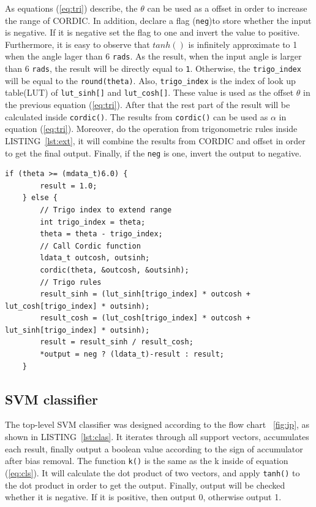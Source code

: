 \documentclass[journal]{IEEEtran}
\newcommand{\fref}[1]{\figurename~\ref{#1}}
\newcommand{\eref}[1]{(\ref{#1})}
\newcommand{\lref}[1]{LISTING~\ref{#1}}
\begin{document}
As equations \eref{eq:tri} describe, the $\theta$ can be used as a offset in order to increase the range of CORDIC.  In addition, declare a flag (\texttt{neg})to store whether the input is negative. If it is negative set the flag to one and invert the value to positive. Furthermore, it is easy to observe that $tanh()$ is infinitely approximate to 1 when the angle lager than 6 \texttt{rads}. As the result, when the input angle is larger than 6 \texttt{rads}, the result will be directly equal to \texttt{1}. Otherwise, the \texttt{trigo\_index} will be equal to the \texttt{round(theta)}. Also, \texttt{trigo\_index} is the index of look up table(LUT) of \texttt{lut\_sinh[]} and \texttt{lut\_cosh[]}. These value is used as the offset $\theta$ in the previous equation \eref{eq:tri}. After that the rest part of the result will be calculated inside \texttt{cordic()}. The results from \texttt{cordic()} can be used as $\alpha$ in equation \eref{eq:tri}. Moreover, do the operation from trigonometric rules inside \lref{lst:ext}, it will combine the results from CORDIC and offset in order to get the final output. Finally, if the \texttt{neg} is one, invert the output to negative. \cite{llamocca2007fixed}

\begin{lstlisting}[float,floatplacement=h,caption={Extending the range of CORDIC},captionpos=b,label=lst:ext]
	if (theta >= (mdata_t)6.0) {
		result = 1.0;
	} else {
		// Trigo index to extend range
		int trigo_index = theta;
		theta = theta - trigo_index;
		// Call Cordic function
		ldata_t outcosh, outsinh;
		cordic(theta, &outcosh, &outsinh);
		// Trigo rules
		result_sinh = (lut_sinh[trigo_index] * outcosh + lut_cosh[trigo_index] * outsinh);
		result_cosh = (lut_cosh[trigo_index] * outcosh + lut_sinh[trigo_index] * outsinh);
		result = result_sinh / result_cosh;
		*output = neg ? (ldata_t)-result : result;
	}
\end{lstlisting}

\subsection{SVM classifier}

The top-level SVM classifier was designed according to the flow chart \fref{fig:ip}, as shown in \lref{lst:clas}. It iterates through all support vectors, accumulates each result, finally output a boolean value according to the sign of accumulator after bias removal. The function \texttt{k()} is the same as the k inside of equation \eref{eq:cls}. It will calculate the dot product of two vectors, and apply \texttt{tanh()} to the dot product in order to get the output. Finally, output will be checked whether it is negative. If it is positive, then output 0, otherwise output 1.
\end{document}
